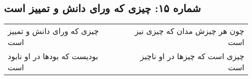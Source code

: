 \begin{center}
\section*{شماره ۱۵: چیزی که ورای دانش و تمییز است}
\label{sec:015}
\begin{longtable}{l p{0.5cm} r}
چیزی که ورای دانش و تمییز است
&&
چون هر چیزش مدان که چیزی نیز است
\\
بودیست که بودها در او نابود است
&&
چیزی است که چیزها در او ناچیز است
\\
\end{longtable}
\end{center}
